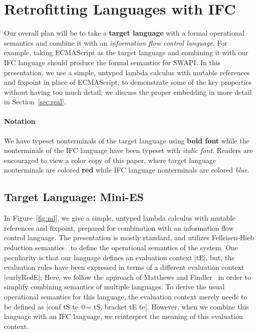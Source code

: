 \section{Retrofitting Languages with IFC}
\label{sec:retrofit}

Our overall plan will be to take a \textbf{{\color{red} target
language}} with a formal operational semantics and combine it with an
\textit{{\color{blue} information flow control language}}.  For example,
taking ECMAScript as the target language and combining it with our IFC
language should produce the formal semantics for SWAPI.  In this
presentation, we use a simple, untyped lambda calculus with mutable
references and fixpoint in place of ECMAScript, to demonstrate some of the key
properties without having too much detail; we discuss the proper
embedding in more detail in Section~\ref{sec:real}.

\paragraph{Notation}
We have typeset nonterminals of the target language using \textbf{{\color{red}
bold font}} while the nonterminals of the IFC language have been typeset
with \textit{{\color{blue} italic font}}.  Readers are encouraged to view
a color copy of this paper, where target language nonterminals are colored \textbf{{\color{red} red}}
while IFC language nonterminals are colored \textit{{\color{blue} blue}}.

\subsection{Target Language: Mini-ES}

In Figure~\ref{fig:ml}, we give a simple, untyped lambda calculus with
mutable references and fixpoint, prepared for combination with an
information flow control language.  The presentation is mostly standard, and utilizes Felleisen-Hieb reduction
semantics~\cite{Felleisen:1992:RRS:136293.136297} to define the
operational semantics of the system.  One peculiarity is that our language
defines an evaluation context |tE|, but, the evaluation rules have been
expressed in terms of a different evaluation context |curlyRedE|;
Here, we follow the approach of Matthews and
Findler~\cite{Matthews:2007:OSM:1190216.1190220} in order to simplify combining
semantics of multiple languages. 
To derive the usual operational semantics for this language, the evaluation
context merely needs to be defined as |conf tS te @= tS, bracket tE te|.
However, when we combine this language with an IFC language, we
reinterpret the meaning of this evaluation context.


